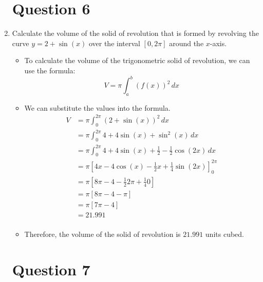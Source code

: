 \documentclass[12pt]{article}
\begin{document}
\begin{enumerate}[leftmargin=\labelsep]
    \newpage

    \section*{Question 6}

    \item Calculate the volume of the solid of revolution that is formed by revolving the curve $y=2+\sin (x)$ over the interval $[0, 2\pi]$ around the $x$-axis.
    \begin{itemize}[label={}]
        \item To calculate the volume of the trigonometric solid of revolution, we can use the formula:
        \begin{equation*}
            \displaystyle{V = \pi \int_{a}^{b} (f(x))^2 \, dx}
        \end{equation*}
        \item We can substitute the values into the formula.
        \begin{equation*}
            \begin{split}
                V &= \pi \int_{0}^{2\pi} (2+\sin (x))^2 \, dx \\
                &= \pi \int_{0}^{2\pi} 4 + 4\sin (x) + \sin^2 (x) \, dx \\
                &= \pi \int_{0}^{2\pi} 4 + 4\sin (x) + \frac{1}{2} - \frac{1}{2} \cos (2x) \, dx \\
                &= \pi \left[ 4x - 4\cos (x) - \frac{1}{2} x + \frac{1}{4} \sin (2x) \right]_{0}^{2\pi} \\
                &= \pi \left[ 8\pi - 4 - \frac{1}{2} 2\pi + \frac{1}{4} 0 \right] \\
                &= \pi \left[ 8\pi - 4 - \pi \right] \\
                &= \pi \left[ 7\pi - 4 \right] \\
                &= 21.991 \\
            \end{split}
        \end{equation*}
        \item Therefore, the volume of the solid of revolution is $21.991$ units cubed.
    \end{itemize}

    \newpage

    \section*{Question 7}
    

\end{enumerate}
\end{document}
